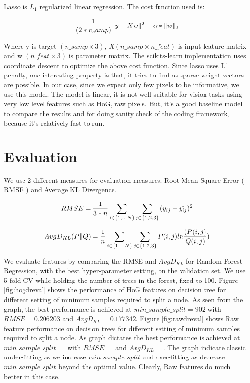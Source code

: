 \documentclass[10pt]{article}
\begin{document}
Lasso is $L_1$ regularized linear regression. The cost function used is:

$${1 \over (2*n_samp)} \| y -Xw \|^2 + \alpha * \| w \|_1$$

Where y is target $(n\_samp \times 3)$, $X (n\_samp \times n\_feat)$ is input feature matrix and w $(n\_feat \times 3)$ is parameter matrix. The scikits-learn implementation uses coordinate descent to optimize the above cost function. Since lasso uses L1 penalty, one interesting property is that, it tries to find as sparse weight vectors are possible. In our case, since we expect only few pixels to be informative, we use this model. The model is linear, it is not well suitable for vision tasks using very low level features such as HoG, raw pixels. But, it's a good baseline model to compare the results and for doing sanity check of the coding framework, because it's relatively fast to run.

\section*{Evaluation}

We use 2 different measures for evaluation measures. Root Mean Square Error ( RMSE ) and Average KL Divergence.

$$RMSE = {1 \over 3*n} \sum_{i \in \{1, ... N\}} \sum_{j \in \{1, 2, 3\} }{ (y_{ij} - \hat{y_{ij}})^2 }$$

$$Avg D_{KL}(P \| Q)= {1 \over n} \sum_{i \in \{1, ... N\}} \sum_{j \in \{1, 2, 3\} }{ P(i, j) ln{( P(i, j) \over Q(i, j)} ) }$$

We evaluate features by comparing the RMSE and $ Avg D_{KL} $ for Random Forest Regression, with the best hyper-parameter setting, on the validation set. We use 5-fold CV while holding the number of trees in the forest, fixed to 100. Figure \ref{fig:hogdreval} shows the performance of HoG features on decision tree for different setting of minimum samples required to split a node. As seen from the graph, the best performance is achieved at  $ min\_sample\_split = 902$ with $RMSE=0.206203$ and $ Avg D_{KL} = 0.177342 $. Figure \ref{fig:rawdreval} shows Raw feature performance on decision trees for different setting of minimum samples required to split a node. As graph dictates the best performance is achieved at $ min\_sample\_split = $ with $RMSE= $ and $ Avg D_{KL} =  $. The graph indicate classic under-fitting as we increase $ min\_sample\_split $ and over-fitting as decrease $ min\_sample\_split $ beyond the optimal value. Clearly, Raw features do much better in this case. 
\end{document}
